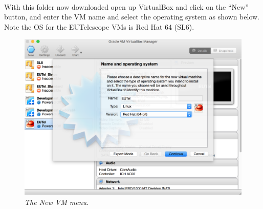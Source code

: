 \documentclass[11pt]{article}
\begin{document}
\paragraph{}
With this folder now downloaded open up VirtualBox and click on the ``New'' button, and enter the VM name and select the operating system as shown below. Note the OS for the EUTelescope VMs is Red Hat 64 (SL6).
\begin{figure}[!ht]
	\centering
	\includegraphics[scale=0.3]{images/new_pc.png}
	\caption{\textit{The New VM menu.}}
\end{figure}
\end{document}
